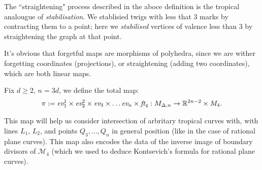 \begin{remark}
    The ``straightening" process described in the aboce definition is the tropical analougue of \textit{stabilisation}. 
    We stablisied twigs with less that $3$ marks by contracting them to a point; here we \textit{stabilised} vertices of valence less than $3$ by straightening the graph at that point. 
\end{remark}

\begin{remark}
    It's obvious that forgetful maps are morphisms of polyhedra, since we are wither forgetting coordinates (projections), or straightening (adding two coordinates), which are both linear maps. 
\end{remark}

\begin{definition}
    Fix $d\geq 2$, $n =3d$, we define the total map:
    \begin{align*}
        \pi:= \emph{ev}^{1}_{1} \times\emph{ev}^{2}_{2} \times\emph{ev}_{3} \times \dots \emph{ev}_{n} \times \emph{ft}_{4}: M_{\Delta, n} \to \mathbb{R}^{2n-2} \times M_{4}.
    \end{align*}
\end{definition}
This map will help us consider intersection of arbritary tropical curves with, with lines $L_{1}$, $L_{2}$, and points $Q_{3}, \dots, Q_{n}$ in general position (like in the case of rational plane curves). 
This map also encodes the data of the inverse image of boundary divisors of $\mathcal{M}_{4}$ (which we used to deduce Kontsevich's formula for rational plane curves).

